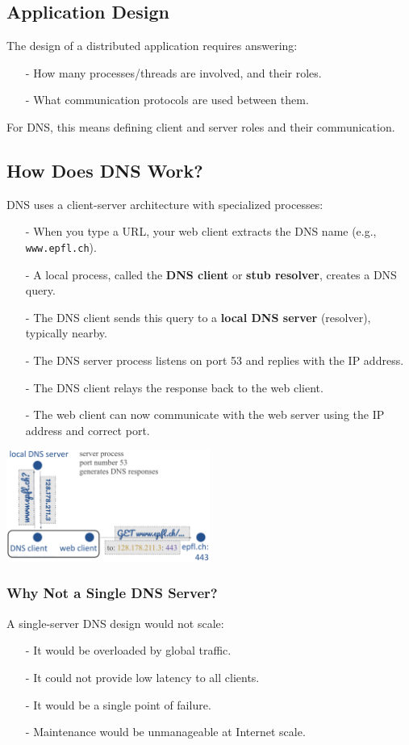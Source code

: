 \documentclass[../../compsys.tex]{subfiles}
\begin{document}
\subsection{Application Design}
The design of a distributed application requires answering:
\begin{itemize}
    \item[-] How many processes/threads are involved, and their roles.
    \item[-] What communication protocols are used between them.
\end{itemize}
For DNS, this means defining client and server roles and their communication.

\subsection{How Does DNS Work?}
DNS uses a client-server architecture with specialized processes:

\begin{itemize}
    \item[-] When you type a URL, your web client extracts the DNS name (e.g., \texttt{www.epfl.ch}).
    \item[-] A local process, called the \textbf{DNS client} or \textbf{stub resolver}, creates a DNS query.
    \item[-] The DNS client sends this query to a \textbf{local DNS server} (resolver), typically nearby.
    \item[-] The DNS server process listens on port 53 and replies with the IP address.
    \item[-] The DNS client relays the response back to the web client.
    \item[-] The web client can now communicate with the web server using the IP address and correct port.
\end{itemize}

\begin{center}
    \includegraphics[width=0.5\textwidth]{images/dns.png}
\end{center}

\subsubsection{Why Not a Single DNS Server?}
A single-server DNS design would not scale:
\begin{itemize}
    \item[-] It would be overloaded by global traffic.
    \item[-] It could not provide low latency to all clients.
    \item[-] It would be a single point of failure.
    \item[-] Maintenance would be unmanageable at Internet scale.
\end{itemize}
\end{document}
